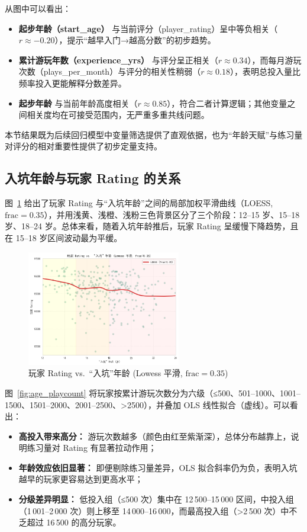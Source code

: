 \documentclass[12pt]{article}
\begin{document}
从图中可以看出：  
\begin{itemize}
	\item \textbf{起步年龄（start\_age）} 与当前评分（player\_rating）呈中等负相关（$r\approx-0.20$），提示“越早入门→越高分数”的初步趋势。  
	\item \textbf{累计游玩年数（experience\_yrs）} 与评分呈正相关（$r\approx0.34$），而每月游玩次数（plays\_per\_month）与评分的相关性稍弱（$r\approx0.18$），表明总投入量比频率投入更能解释分数差异。  
	\item \textbf{起步年龄} 与当前年龄高度相关（$r\approx0.85$），符合二者计算逻辑；其他变量之间相关度均在可接受范围内，无严重多重共线问题。  
\end{itemize}

本节结果既为后续回归模型中变量筛选提供了直观依据，也为“年龄天赋”与练习量对评分的相对重要性提供了初步定量支持。

\subsection{入坑年龄与玩家 Rating 的关系}

图~\ref{fig:age_loess} 给出了玩家 Rating 与“入坑年龄”之间的局部加权平滑曲线（LOESS, $\mathrm{frac}=0.35$），并用浅黄、浅橙、浅粉三色背景区分了三个阶段：12–15 岁、15–18 岁、18–24 岁。总体来看，随着入坑年龄推后，玩家 Rating 呈缓慢下降趋势，且在 15–18 岁区间波动最为平缓。

\begin{figure}[htbp]
	\centering
	\includegraphics[width=0.6\textwidth]{fig2.png}
	\caption{玩家 Rating vs.\ “入坑”年龄 (Lowess 平滑, $\mathrm{frac}=0.35$)}
	\label{fig:age_loess}
\end{figure}

图~\ref{fig:age_playcount} 将玩家按累计游玩次数分为六级（≤500、501–1000、1001–1500、1501–2000、2001–2500、>2500），并叠加 OLS 线性拟合（虚线）。可以看出：  
\begin{itemize}
	\item \textbf{高投入带来高分：} 游玩次数越多（颜色由红至紫渐深），总体分布越靠上，说明练习量对 Rating 有显著拉动作用；  
	\item \textbf{年龄效应依旧显著：} 即便剔除练习量差异，OLS 拟合斜率仍为负，表明入坑越早的玩家更容易达到更高水平；  
	\item \textbf{分级差异明显：} 低投入组（≤500 次）集中在 12\,500–15\,000 区间，中投入组（1\,001–2\,000 次）则上移至 14\,000–16\,000，而最高投入组（>2\,500 次）中不乏超过 16\,500 的高分玩家。
\end{itemize}
\end{document}
